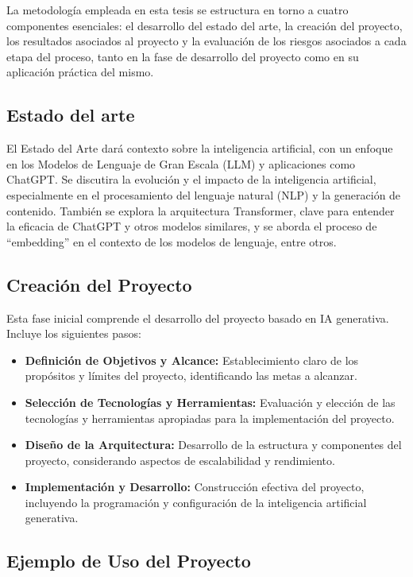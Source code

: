 La metodología empleada en esta tesis se estructura en torno a cuatro componentes esenciales: 
el desarrollo del estado del arte, la creación del proyecto, los resultados asociados al proyecto y la evaluación de los riesgos asociados 
a cada etapa del proceso, tanto en la fase de desarrollo del proyecto como en su aplicación práctica del mismo.

\subsection{Estado del arte}
El Estado del Arte dará contexto sobre la inteligencia artificial, con un enfoque en los Modelos de Lenguaje de Gran Escala (LLM) 
y aplicaciones como ChatGPT. Se discutira la evolución y el impacto de la inteligencia artificial, especialmente en el procesamiento 
del lenguaje natural (NLP) y la generación de contenido. También se explora la arquitectura Transformer, clave para entender la 
eficacia de ChatGPT y otros modelos similares, y se aborda el proceso de ``embedding'' en el contexto de los modelos de lenguaje, entre otros.


\subsection{Creación del Proyecto}


\noindent Esta fase inicial comprende el desarrollo del proyecto basado en IA generativa. Incluye los siguientes pasos:

\begin{itemize}
    \item \textbf{Definición de Objetivos y Alcance:} Establecimiento claro de los propósitos y límites del proyecto, identificando las metas a alcanzar.
    \item \textbf{Selección de Tecnologías y Herramientas:} Evaluación y elección de las tecnologías y herramientas apropiadas para la implementación del proyecto.
    \item \textbf{Diseño de la Arquitectura:} Desarrollo de la estructura y componentes del proyecto, considerando aspectos de escalabilidad y rendimiento.
    \item \textbf{Implementación y Desarrollo:} Construcción efectiva del proyecto, incluyendo la programación y configuración de la inteligencia artificial generativa.
\end{itemize}
\subsection{Ejemplo de Uso del Proyecto}

